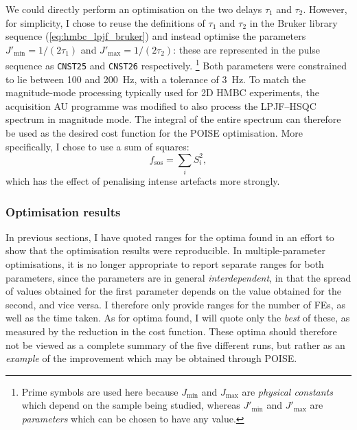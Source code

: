 We could directly perform an optimisation on the two delays $\tau_1$ and $\tau_2$.
However, for simplicity, I chose to reuse the definitions of $\tau_1$ and $\tau_2$ in the Bruker library sequence (\cref{eq:hmbc_lpjf_bruker}) and instead optimise the parameters $J'_\text{min} = 1/(2\tau_1)$ and $J'_\text{max}=1/(2\tau_2)$: these are represented in the pulse sequence as \texttt{CNST25} and \texttt{CNST26} respectively.%
\footnote{Prime symbols are used here because $J_\text{min}$ and $J_\text{max}$ are \textit{physical constants} which depend on the sample being studied, whereas $J'_\text{min}$ and $J'_\text{max}$ are \textit{parameters} which can be chosen to have any value.} 
Both parameters were constrained to lie between 100 and \qty{200}{\Hz}, with a tolerance of \qty{3}{\Hz}.
To match the magnitude-mode processing typically used for 2D HMBC experiments, the acquisition AU programme was modified to also process the LPJF--HSQC spectrum in magnitude mode.
The integral of the entire spectrum can therefore be used as the desired cost function for the POISE optimisation.
More specifically, I chose to use a sum of squares:
\begin{equation}
    \label{eq:sos_cost_function}
    f_\text{sos} = \sum_i S_i^2,
\end{equation}
which has the effect of penalising intense artefacts more strongly.


\subsubsection{Optimisation results}

In previous sections, I have quoted ranges for the optima found in an effort to show that the optimisation results were reproducible.
In multiple-parameter optimisations, it is no longer appropriate to report separate ranges for both parameters, since the parameters are in general \textit{interdependent}, in that the spread of values obtained for the first parameter depends on the value obtained for the second, and vice versa.
I therefore only provide ranges for the number of FEs, as well as the time taken.
As for optima found, I will quote only the \textit{best} of these, as measured by the reduction in the cost function.
These optima should therefore not be viewed as a complete summary of the five different runs, but rather as an \textit{example} of the improvement which may be obtained through POISE.


